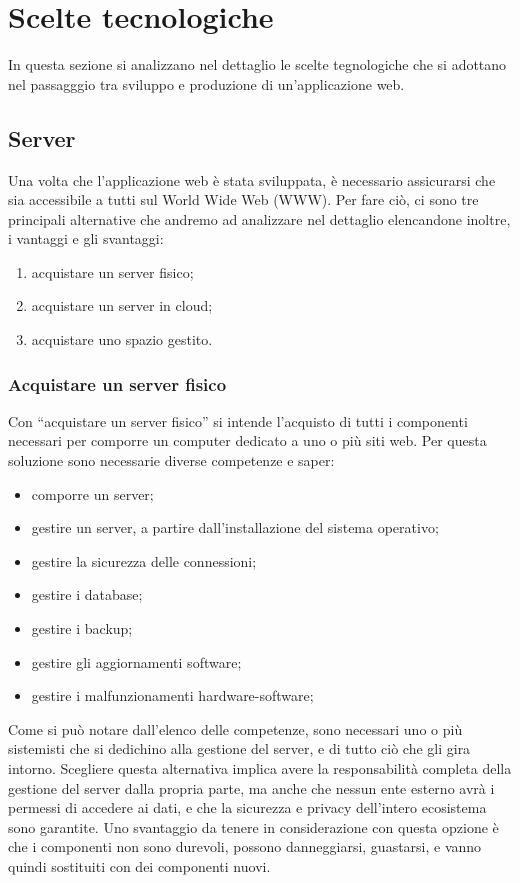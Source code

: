 \documentclass[12pt,a4paper]{article}
\begin{document}
\clearpage
\section{Scelte tecnologiche}
In questa sezione si analizzano nel dettaglio le scelte tegnologiche che si adottano nel passagggio tra sviluppo e produzione di un'applicazione web.

\subsection{Server}

Una volta che l’applicazione web è stata sviluppata, è necessario assicurarsi che sia accessibile a tutti sul World Wide Web (WWW). Per fare ciò, ci sono tre principali alternative che andremo ad analizzare nel dettaglio elencandone inoltre, i vantaggi e gli svantaggi:
\begin{enumerate}
    \item acquistare un server fisico;
    \item acquistare un server in cloud;
    \item acquistare uno spazio gestito.
\end{enumerate}
\subsubsection{Acquistare un server fisico}
Con “acquistare un server fisico” si intende l’acquisto di tutti i componenti necessari per comporre un computer dedicato a uno o più siti web. Per questa soluzione sono necessarie diverse competenze e saper:

\begin{itemize}
    \item comporre un server;
    \item gestire un server, a partire dall’installazione del sistema operativo;
    \item gestire la sicurezza delle connessioni;
    \item gestire i database;
    \item gestire i backup;
    \item gestire gli aggiornamenti software;
    \item gestire i malfunzionamenti hardware-software;
\end{itemize}

Come si può notare dall’elenco delle competenze, sono necessari uno o più sistemisti che si dedichino alla gestione del server, e di tutto ciò che gli gira intorno.
Scegliere questa alternativa implica avere la responsabilità completa della gestione del server dalla propria parte, ma anche che nessun ente esterno avrà i permessi di accedere ai dati, e che la sicurezza e privacy dell’intero ecosistema sono garantite. Uno svantaggio da tenere in considerazione con questa opzione è che i componenti non sono durevoli, possono danneggiarsi, guastarsi, e vanno quindi sostituiti con dei componenti nuovi.
\end{document}
